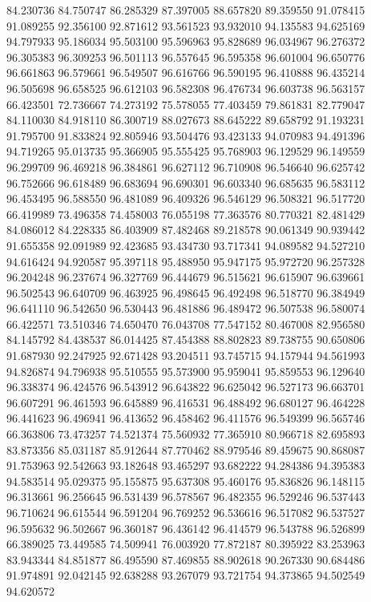 84.230736
84.750747
86.285329
87.397005
88.657820
89.359550
91.078415
91.089255
92.356100
92.871612
93.561523
93.932010
94.135583
94.625169
94.797933
95.186034
95.503100
95.596963
95.828689
96.034967
96.276372
96.305383
96.309253
96.501113
96.557645
96.595358
96.601004
96.650776
96.661863
96.579661
96.549507
96.616766
96.590195
96.410888
96.435214
96.505698
96.658525
96.612103
96.582308
96.476734
96.603738
96.563157
66.423501
72.736667
74.273192
75.578055
77.403459
79.861831
82.779047
84.110030
84.918110
86.300719
88.027673
88.645222
89.658792
91.193231
91.795700
91.833824
92.805946
93.504476
93.423133
94.070983
94.491396
94.719265
95.013735
95.366905
95.555425
95.768903
96.129529
96.149559
96.299709
96.469218
96.384861
96.627112
96.710908
96.546640
96.625742
96.752666
96.618489
96.683694
96.690301
96.603340
96.685635
96.583112
96.453495
96.588550
96.481089
96.409326
96.546129
96.508321
96.517720
66.419989
73.496358
74.458003
76.055198
77.363576
80.770321
82.481429
84.086012
84.228335
86.403909
87.482468
89.218578
90.061349
90.939442
91.655358
92.091989
92.423685
93.434730
93.717341
94.089582
94.527210
94.616424
94.920587
95.397118
95.488950
95.947175
95.972720
96.257328
96.204248
96.237674
96.327769
96.444679
96.515621
96.615907
96.639661
96.502543
96.640709
96.463925
96.498645
96.492498
96.518770
96.384949
96.641110
96.542650
96.530443
96.481886
96.489472
96.507538
96.580074
66.422571
73.510346
74.650470
76.043708
77.547152
80.467008
82.956580
84.145792
84.438537
86.014425
87.454388
88.802823
89.738755
90.650806
91.687930
92.247925
92.671428
93.204511
93.745715
94.157944
94.561993
94.826874
94.796938
95.510555
95.573900
95.959041
95.859553
96.129640
96.338374
96.424576
96.543912
96.643822
96.625042
96.527173
96.663701
96.607291
96.461593
96.645889
96.416531
96.488492
96.680127
96.464228
96.441623
96.496941
96.413652
96.458462
96.411576
96.549399
96.565746
66.363806
73.473257
74.521374
75.560932
77.365910
80.966718
82.695893
83.873356
85.031187
85.912644
87.770462
88.979546
89.459675
90.868087
91.753963
92.542663
93.182648
93.465297
93.682222
94.284386
94.395383
94.583514
95.029375
95.155875
95.637308
95.460176
95.836826
96.148115
96.313661
96.256645
96.531439
96.578567
96.482355
96.529246
96.537443
96.710624
96.615544
96.591204
96.769252
96.536616
96.517082
96.537527
96.595632
96.502667
96.360187
96.436142
96.414579
96.543788
96.526899
66.389025
73.449585
74.509941
76.003920
77.872187
80.395922
83.253963
83.943344
84.851877
86.495590
87.469855
88.902618
90.267330
90.684486
91.974891
92.042145
92.638288
93.267079
93.721754
94.373865
94.502549
94.620572
